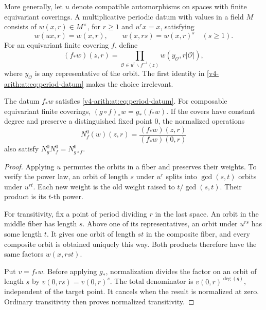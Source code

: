 More generally, let \(u\) denote compatible automorphisms on spaces
with finite equivariant coverings. A multiplicative periodic datum
with values in a field \(M\) consists of
\(w(x,r)\in M^\times\), for \(r\geq1\) and \(u^rx=x\), satisfying
\begin{equation}\label{v4-arith:at:eq:period-datum}
 w(ux,r)=w(x,r),\qquad w(x,rs)=w(x,r)^s\quad(s\geq1).
\end{equation}
For an equivariant finite covering \(f\), define
\begin{equation}\label{v4-arith:at:eq:orbit-norm}
 (f_*w)(z,r)=
 \prod_{\mathcal O\in u^r\backslash f^{-1}(z)}
       w(y_{\mathcal O},r|\mathcal O|),
\end{equation}
where \(y_{\mathcal O}\) is any representative of the orbit.
The first identity in \eqref{v4-arith:at:eq:period-datum} makes the choice
irrelevant.

\begin{proposition}\label{v4-arith:at:prop:norms}
The datum \(f_*w\) satisfies \eqref{v4-arith:at:eq:period-datum}.
For composable equivariant finite coverings,
\((g\circ f)_*w=g_*(f_*w)\).
If the covers have constant degree and preserve a distinguished
fixed point \(0\), the normalized operations
\begin{equation}\label{v4-arith:at:eq:normalized-norm}
 N_f^0(w)(z,r)=\frac{(f_*w)(z,r)}{(f_*w)(0,r)}
\end{equation}
also satisfy \(N_g^0N_f^0=N_{g\circ f}^0\).
\end{proposition}
\begin{proof}
Applying \(u\) permutes the orbits in a fiber and preserves their
weights. To verify the power law, an orbit of length \(s\) under
\(u^r\) splits into \(\gcd(s,t)\) orbits under \(u^{rt}\).
Each new weight is the old weight raised to
\(t/\gcd(s,t)\). Their product is its \(t\)-th power.

For transitivity, fix a point of period dividing \(r\) in the
last space. An orbit in the middle fiber has length \(s\).
Above one of its representatives, an orbit under \(u^{rs}\)
has some length \(t\). It gives one orbit of length \(st\)
in the composite fiber, and every composite orbit is obtained
uniquely this way. Both products therefore have the same factors
\(w(x,rst)\).

Put \(v=f_*w\). Before applying \(g_*\), normalization divides
the factor on an orbit of length \(s\) by
\(v(0,rs)=v(0,r)^s\). The total denominator is
\(v(0,r)^{\deg(g)}\), independent of the target point.
It cancels when the result is normalized at zero.
Ordinary transitivity then proves normalized transitivity.
\end{proof}

